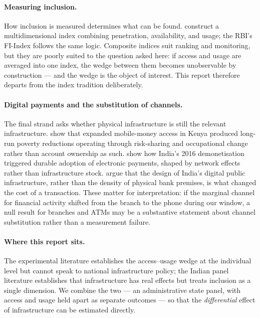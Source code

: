 \paragraph{Measuring inclusion.} How inclusion is measured determines what can be found.
\citet{sarma2008,sarma2012} construct a multidimensional index combining penetration, availability,
and usage; the RBI's FI-Index follows the same logic. Composite indices suit ranking and
monitoring, but they are poorly suited to the question asked here: if access and usage are averaged
into one index, the wedge between them becomes unobservable by construction --- and the wedge is
the object of interest. This report therefore departs from the index tradition deliberately.

\paragraph{Digital payments and the substitution of channels.} The final strand asks whether
physical infrastructure is still the relevant infrastructure. \citet{suri2016} show that expanded
mobile-money access in Kenya produced long-run poverty reductions operating through risk-sharing
and occupational change rather than account ownership as such. \citet{crouzet2023} show how India's
2016 demonetisation triggered durable adoption of electronic payments, shaped by network effects
rather than infrastructure stock. \citet{dsilva2019} argue that the design of India's digital public
infrastructure, rather than the density of physical bank premises, is what changed the cost of a
transaction. These matter for interpretation: if the marginal channel for financial activity
shifted from the branch to the phone during our window, a null result for branches and ATMs may be
a substantive statement about channel substitution rather than a measurement failure.

\paragraph{Where this report sits.} The experimental literature establishes the access--usage wedge
at the individual level but cannot speak to national infrastructure policy; the Indian panel
literature establishes that infrastructure has real effects but treats inclusion as a single
dimension. We combine the two --- an administrative state panel, with access and usage held apart
as separate outcomes --- so that the \emph{differential} effect of infrastructure can be estimated
directly.

